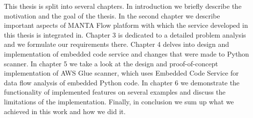 This thesis is split into several chapters. In introduction we briefly describe the motivation and the goal of the thesis. In the second chapter we describe important aspects of MANTA Flow platform with which the service developed in this thesis is integrated in. Chapter 3 is dedicated to a detailed problem analysis and we formulate our requirements there. Chapter 4 delves into design and implementation of embedded code service and changes that were made to Python scanner. In chapter 5 we take a look at the design and proof-of-concept implementation of AWS Glue scanner, which uses Embedded Code Service for data flow analysis of embedded Python code. In chapter 6 we demonstrate the functionality of implemented features on several examples and discuss the limitations of the implementation. Finally, in conclusion we sum up what we achieved in this work and how we did it.